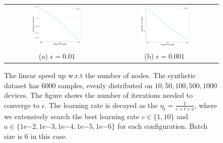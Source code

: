 \begin{figure}
\centering
\begin{tabular}{cc}
	\includegraphics[width=0.5\textwidth]{fig/synthetic_linear_regression_1k_6k-epsilon01-logTrue.pdf} & 
\includegraphics[width=0.5\textwidth]{fig/synthetic_linear_regression_1k_6k-epsilon001-logTrue-epoch-1.pdf} \\
(a) $\epsilon=0.01$  & (b) $\epsilon=0.001$
\end{tabular}
	\caption{The linear speed up w.r.t the number of nodes. The synthetic dataset has $6000$ samples, evenly distributed on $10, 50, 100, 500, 1000$ devices. The figure shows the number of iterations needed to converge to $\epsilon$. The learning rate is decayed as the $\eta_t = \frac{1}{c + t \times a}$, where we extensively search the best learning rate $c \in \{1, 10\}$ and $a \in \{1\mathrm{e}{-2}, 1\mathrm{e}{-3}, 1\mathrm{e}{-4}, 1\mathrm{e}{-5}, 1\mathrm{e}{-6}\}$ for each configuration. Batch size is 6 in this case.}
\end{figure}

